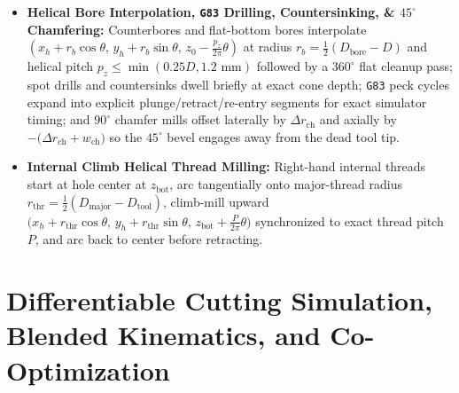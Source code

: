 \documentclass[conference]{IEEEtran}
\begin{document}
\begin{itemize}
  \begin{equation}
    \begin{aligned}
      z_{\text{CL}}(x, y) = \max_{\xi^2 + \eta^2 \le R_b^2} \Big[&z_{\text{tgt}}(x + \xi, y + \eta) \\
      &+ \sqrt{R_b^2 - \xi^2 - \eta^2} - R_b\Big],
    \end{aligned}
    \label{eq:ball_cl}
  \end{equation}
  clipped strictly to the eroded interior of $\Omega_{\text{3D}}$ and clamped below by the surrounding pocket floor $z_{\text{floor}}(\Omega_{\text{3D}})$ so the spherical flank never undercuts adjacent planar shelves.
  \item \textbf{Helical Bore Interpolation, \texttt{G83} Drilling, Countersinking, \& $45^\circ$ Chamfering:} Counterbores and flat-bottom bores interpolate $(x_h + r_b\cos\theta,\, y_h + r_b\sin\theta,\, z_0 - \frac{p_z}{2\pi}\theta)$ at radius $r_b = \frac{1}{2}(D_{\text{bore}} - D)$ and helical pitch $p_z \le \min(0.25 D, 1.2\text{ mm})$ followed by a $360^\circ$ flat cleanup pass; spot drills and countersinks dwell briefly at exact cone depth; \texttt{G83} peck cycles expand into explicit plunge/retract/re-entry segments for exact simulator timing; and $90^\circ$ chamfer mills offset laterally by $\Delta r_{\text{ch}}$ and axially by $-\big(\Delta r_{\text{ch}} + w_{\text{ch}}\big)$ so the $45^\circ$ bevel engages away from the dead tool tip.
  \item \textbf{Internal Climb Helical Thread Milling:} Right-hand internal threads start at hole center at $z_{\text{bot}}$, arc tangentially onto major-thread radius $r_{\text{thr}} = \frac{1}{2}(D_{\text{major}} - D_{\text{tool}})$, climb-mill upward $\big(x_h + r_{\text{thr}}\cos\theta,\, y_h + r_{\text{thr}}\sin\theta,\, z_{\text{bot}} + \frac{P}{2\pi}\theta\big)$ synchronized to exact thread pitch $P$, and arc back to center before retracting.
\end{itemize}

\section{Differentiable Cutting Simulation, Blended Kinematics, and Co-Optimization}
\label{sec:diffsim_methods}
\end{document}
